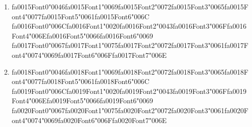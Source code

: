 \documentclass[12pt]{article}
\begin{document}
\begin{enumerate}[label=\arabic*.]
\begin{enumerate}[label=(\alph*)]
    \item {\csname fa0015Font0\endcsname\char"0046}{\csname fa0015Font1\endcsname\char"0069}{\csname fa0015Font2\endcsname\char"0072}{\csname fa0015Font3\endcsname\char"0065}{\csname fa0015Font4\endcsname\char"0077}{\csname fa0015Font5\endcsname\char"0061}{\csname fa0015Font6\endcsname\char"006C} {\csname fa0016Font0\endcsname\char"006C}{\csname fa0016Font1\endcsname\char"0020}{\csname fa0016Font2\endcsname\char"0043}{\csname fa0016Font3\endcsname\char"006F}{\csname fa0016Font4\endcsname\char"006E}{\csname fa0016Font5\endcsname\char"0066}{\csname fa0016Font6\endcsname\char"0069} {\csname fa0017Font0\endcsname\char"0067}{\csname fa0017Font1\endcsname\char"0075}{\csname fa0017Font2\endcsname\char"0072}{\csname fa0017Font3\endcsname\char"0061}{\csname fa0017Font4\endcsname\char"0074}{\char"0069}{\csname fa0017Font6\endcsname\char"006F}{\csname fa0017Font7\endcsname\char"006E}
    \item {\csname fa0018Font0\endcsname\char"0046}{\csname fa0018Font1\endcsname\char"0069}{\csname fa0018Font2\endcsname\char"0072}{\csname fa0018Font3\endcsname\char"0065}{\csname fa0018Font4\endcsname\char"0077}{\csname fa0018Font5\endcsname\char"0061}{\csname fa0018Font6\endcsname\char"006C} {\csname fa0019Font0\endcsname\char"006C}{\csname fa0019Font1\endcsname\char"0020}{\csname fa0019Font2\endcsname\char"0043}{\csname fa0019Font3\endcsname\char"006F}{\csname fa0019Font4\endcsname\char"006E}{\csname fa0019Font5\endcsname\char"0066}{\csname fa0019Font6\endcsname\char"0069} {\csname fa0020Font0\endcsname\char"0067}{\csname fa0020Font1\endcsname\char"0075}{\csname fa0020Font2\endcsname\char"0072}{\csname fa0020Font3\endcsname\char"0061}{\csname fa0020Font4\endcsname\char"0074}{\char"0069}{\csname fa0020Font6\endcsname\char"006F}{\csname fa0020Font7\endcsname\char"006E}
\end{enumerate}
\end{enumerate}
\end{document}
